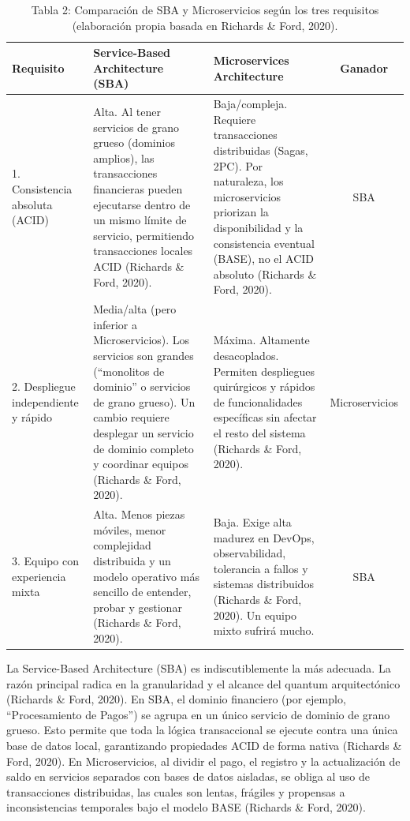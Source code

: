 \documentclass[12pt, a4paper]{article}
\begin{document}
    \begin{table}[H]
        \centering
        \begin{tabular}{|p{2.6cm}|p{4.2cm}|p{4.2cm}|c|}
            \toprule
            \textbf{Requisito} & \textbf{Service-Based Architecture (SBA)} & \textbf{Microservices Architecture} & \textbf{Ganador} \\
            \midrule
            1. Consistencia absoluta (ACID) & Alta. Al tener servicios de grano grueso (dominios amplios), las transacciones financieras pueden ejecutarse dentro de un mismo límite de servicio, permitiendo transacciones locales ACID (Richards \& Ford, 2020). & Baja/compleja. Requiere transacciones distribuidas (Sagas, 2PC). Por naturaleza, los microservicios priorizan la disponibilidad y la consistencia eventual (BASE), no el ACID absoluto (Richards \& Ford, 2020). & SBA \\
            2. Despliegue independiente y rápido & Media/alta (pero inferior a Microservicios). Los servicios son grandes (“monolitos de dominio” o servicios de grano grueso). Un cambio requiere desplegar un servicio de dominio completo y coordinar equipos (Richards \& Ford, 2020). & Máxima. Altamente desacoplados. Permiten despliegues quirúrgicos y rápidos de funcionalidades específicas sin afectar el resto del sistema (Richards \& Ford, 2020). & Microservicios \\
            3. Equipo con experiencia mixta & Alta. Menos piezas móviles, menor complejidad distribuida y un modelo operativo más sencillo de entender, probar y gestionar (Richards \& Ford, 2020). & Baja. Exige alta madurez en DevOps, observabilidad, tolerancia a fallos y sistemas distribuidos (Richards \& Ford, 2020). Un equipo mixto sufrirá mucho. & SBA \\
            \bottomrule
        \end{tabular}
        \caption*{Tabla 2: Comparación de SBA y Microservicios según los tres requisitos (elaboración propia basada en Richards \& Ford, 2020).}
    \end{table}

    La Service-Based Architecture (SBA) es indiscutiblemente la más adecuada. La razón principal radica en la granularidad y el alcance del quantum arquitectónico (Richards \& Ford, 2020). En SBA, el dominio financiero (por ejemplo, “Procesamiento de Pagos”) se agrupa en un único servicio de dominio de grano grueso. Esto permite que toda la lógica transaccional se ejecute contra una única base de datos local, garantizando propiedades ACID de forma nativa (Richards \& Ford, 2020). En Microservicios, al dividir el pago, el registro y la actualización de saldo en servicios separados con bases de datos aisladas, se obliga al uso de transacciones distribuidas, las cuales son lentas, frágiles y propensas a inconsistencias temporales bajo el modelo BASE (Richards \& Ford, 2020).
\end{document}

